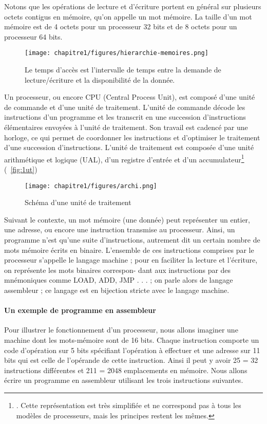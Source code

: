 Notons que les opérations de lecture et d’écriture portent en général sur plusieurs octets contigus en mémoire,
qu’on appelle un mot mémoire. La taille d’un mot mémoire est de 4 octets pour un processeur 32 bits et de 8
octets pour un processeur 64 bits.

\begin{figure}
    \centering
    \texttt{[image: chapitre1/figures/hierarchie-memoires.png]}
    \caption{ Le temps d’accès est l’intervalle de temps entre la demande de lecture/écriture et la disponibilité de
la donnée.}
    \label{fig:my_label}
\end{figure}


Un processeur, ou encore CPU (Central Process Unit), est composé d’une unité de commande et d’une unité de
traitement.
L’unité de commande décode les instructions d’un programme et les transcrit en une succession d’instructions
élémentaires envoyées à l’unité de traitement. Son travail est cadencé par une horloge, ce qui permet de
coordonner les instructions et d’optimiser le traitement d’une succession d’instructions.
L’unité de traitement est composée d’une unité arithmétique et logique (UAL), d’un registre d’entrée et d’un
accumulateur\footnote{. Cette représentation est très simplifiée et ne correspond pas à tous les modèles de processeurs, mais les principes restent les mêmes.} (~\autoref{fig:1ut})

\begin{figure}
    \centering
    \texttt{[image: chapitre1/figures/archi.png]}
    \caption{Schéma d’une unité de traitement}
    \label{fig:1ut}
\end{figure}

Suivant le contexte, un mot mémoire (une donnée) peut représenter un entier, une adresse, ou encore une
instruction transmise au processeur. Ainsi, un programme n’est qu’une suite d’instructions, autrement dit un
certain nombre de mots mémoire écrits en binaire. L’ensemble de ces instructions comprises par le processeur
s’appelle le langage machine ; pour en faciliter la lecture et l’écriture, on représente les mots binaires correspon-
dant aux instructions par des mnémoniques comme LOAD, ADD, JMP . . . ; on parle alors de langage assembleur ;
ce langage est en bijection stricte avec le langage machine.

\paragraph{Un exemple de programme en assembleur}
Pour illustrer le fonctionnement d’un processeur, nous allons imaginer une machine dont les mots-mémoire
sont de 16 bits. Chaque instruction comporte un code d’opération sur 5 bits spécifiant l’opération à effectuer et
une adresse sur 11 bits qui est celle de l’opérande de cette instruction. Ainsi il peut y avoir 25 = 32 instructions
différentes et 211 = 2048 emplacements en mémoire.
Nous allons écrire un programme en assembleur utilisant les trois instructions suivantes.

